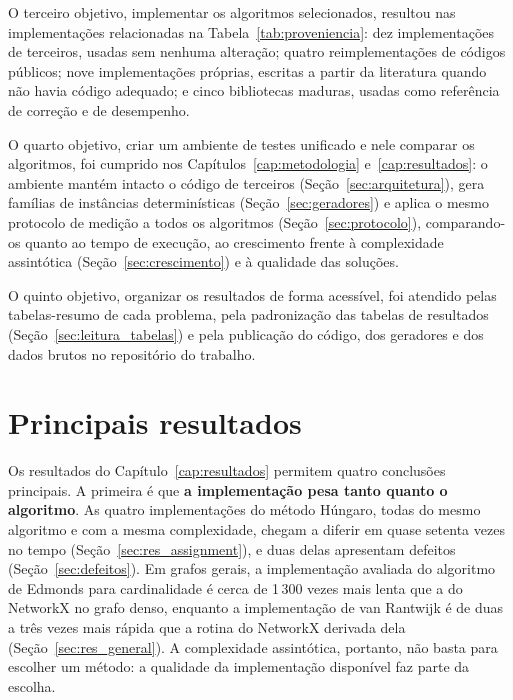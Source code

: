 O terceiro objetivo, implementar os algoritmos selecionados, resultou nas implementações relacionadas na Tabela~\ref{tab:proveniencia}: dez implementações de terceiros, usadas sem nenhuma alteração; quatro reimplementações de códigos públicos; nove implementações próprias, escritas a partir da literatura quando não havia código adequado; e cinco bibliotecas maduras, usadas como referência de correção e de desempenho.

O quarto objetivo, criar um ambiente de testes unificado e nele comparar os algoritmos, foi cumprido nos Capítulos~\ref{cap:metodologia} e~\ref{cap:resultados}: o ambiente mantém intacto o código de terceiros (Seção~\ref{sec:arquitetura}), gera famílias de instâncias determinísticas (Seção~\ref{sec:geradores}) e aplica o mesmo protocolo de medição a todos os algoritmos (Seção~\ref{sec:protocolo}), comparando-os quanto ao tempo de execução, ao crescimento frente à complexidade assintótica (Seção~\ref{sec:crescimento}) e à qualidade das soluções.

O quinto objetivo, organizar os resultados de forma acessível, foi atendido pelas tabelas-resumo de cada problema, pela padronização das tabelas de resultados (Seção~\ref{sec:leitura_tabelas}) e pela publicação do código, dos geradores e dos dados brutos no repositório do trabalho.

\section{Principais resultados}
\label{sec:principais_resultados}

Os resultados do Capítulo~\ref{cap:resultados} permitem quatro conclusões principais. A primeira é que \textbf{a implementação pesa tanto quanto o algoritmo}. As quatro implementações do método Húngaro, todas do mesmo algoritmo e com a mesma complexidade, chegam a diferir em quase setenta vezes no tempo (Seção~\ref{sec:res_assignment}), e duas delas apresentam defeitos (Seção~\ref{sec:defeitos}). Em grafos gerais, a implementação avaliada do algoritmo de Edmonds para cardinalidade é cerca de 1\,300 vezes mais lenta que a do NetworkX no grafo denso, enquanto a implementação de van Rantwijk é de duas a três vezes mais rápida que a rotina do NetworkX derivada dela (Seção~\ref{sec:res_general}). A complexidade assintótica, portanto, não basta para escolher um método: a qualidade da implementação disponível faz parte da escolha.

